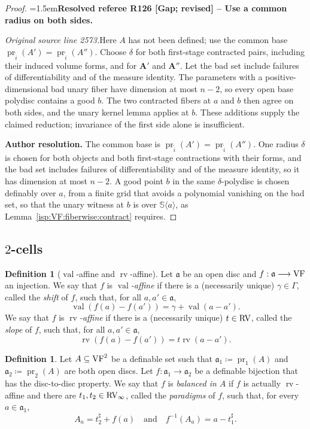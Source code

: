 \documentclass[12pt]{amsart}
\newcommand{\ResolvedRefereeRemark}[5]{%
  \par\medskip\begingroup\normalfont\small\color{gray}%
  \emergencystretch=1.5em\noindent\textbf{Resolved referee R#1 [#2] -- #3.}\par\nobreak\noindent #4\par
  \medskip\color{ResolutionGreen}\noindent\textbf{Author resolution.} #5\par
  \endgroup\medskip
}
\newcommand{\memph}[1]{{\color{magenta}\emph{#1}}}
\theoremstyle{plain}
\theoremstyle{definition}
\newtheorem{defn}[thm]{Definition}
\theoremstyle{remark}
\numberwithin{equation}{section}
\theoremstyle{plain}
\newcommand{\VF}{\textup{VF}}
\newcommand{\RV}{\textup{RV}}
\DeclareMathOperator{\pr}{pr}
\newcommand{\dand}{\quad \text{and} \quad}
\newcommand{\ga}{\mathfrak{a}}
\newcommand{\0}{\emptyset}
\newcommand{\fun}{\longrightarrow}
\newcommand{\sub}{\subseteq}
\newcommand{\la}{\langle}
\newcommand{\ra}{\rangle}
\DeclareMathOperator{\rv}{rv}
\DeclareMathOperator{\vv}{val}
\begin{document}
\begin{proof}
\ResolvedRefereeRemark{126}{Gap; revised}{Use a common radius on both sides}{%
\textit{Original source line 2573.}\quad Here $A$ has not been defined; use the common base $\pr_{\tilde i}(A')=\pr_{\tilde i}(A'')$. Choose $\delta$ for both first-stage contracted pairs, including their induced volume forms, and for $\bm A'$ and $\bm A''$. Let the bad set include failures of differentiability and of the measure identity. The parameters with a positive-dimensional bad unary fiber have dimension at most $n-2$, so every open base polydisc contains a good $b$. The two contracted fibers at $a$ and $b$ then agree on both sides, and the unary kernel lemma applies at $b$. These additions supply the claimed reduction; invariance of the first side alone is insufficient.
}{The common base is $\pr_{\tilde i}(A')=\pr_{\tilde i}(A'')$. One radius $\delta$ is chosen for both objects and both first-stage contractions with their forms, and the bad set includes failures of differentiability and of the measure identity, so it has dimension at most $n-2$. A good point $b$ in the same $\delta$-polydisc is chosen definably over $a$, from a finite grid that avoids a polynomial vanishing on the bad set, so that the unary witness at $b$ is over $\mathbb S\la a\ra$, as Lemma~\ref{isp:VF:fiberwise:contract} requires.}
\end{proof}

\subsection{$2$-cells}

\begin{defn}[$\vv$-affine and $\rv$-affine]\label{rvaffine}
Let $\ga$ be an open disc and $f : \ga \fun \VF$ an injection.
We say that $f$ is \memph{$\vv$-affine} if there is a (necessarily unique) $\gamma \in \Gamma$, called the \memph{shift} of $f$, such that, for all $a, a' \in \ga$,
\[
\vv(f(a) - f(a')) = \gamma + \vv(a - a').
\]
We say that $f$ is \memph{$\rv$-affine} if there is a (necessarily unique) $t \in \RV$, called the \memph{slope} of $f$, such that, for all $a, a' \in \ga$,
\[
\rv(f(a) - f(a')) = t \rv(a - a').
\]
\end{defn}

\begin{defn}\label{defn:balance}
Let $A \sub \VF^2$ be a definable set such that $\ga_1 \coloneqq \pr_1(A)$ and $\ga_2 \coloneqq \pr_2(A)$ are both open discs. Let $f : \ga_1 \fun \ga_2$ be a definable bijection that has the disc-to-disc property.  We say that $f$ is \memph{balanced in $A$} if $f$ is actually $\rv$-affine and there are $t_1, t_2 \in \RV_\infty$, called the \memph{paradigms} of $f$, such that, for every $a \in \ga_1$,
\[
A_a = t_2^\sharp + f(a) \dand f^{-1}(A_a) = a - t_1^\sharp.
\]
\end{defn}
\end{document}

